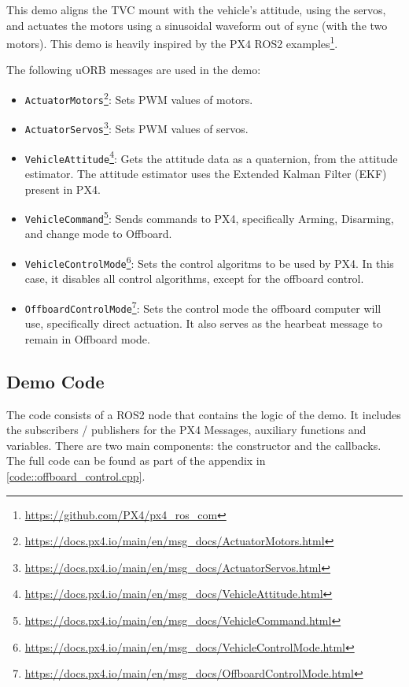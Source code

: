 \documentclass[a4paper]{article}
\begin{document}
This demo aligns the TVC mount with the vehicle's attitude, using the servos, and actuates the motors using a sinusoidal waveform out of sync (with the two motors). 
This demo is heavily inspired by the PX4 ROS2 examples\footnote{\url{https://github.com/PX4/px4_ros_com}}. 

The following uORB messages are used in the demo: 

\begin{itemize}
    \item \verb|ActuatorMotors|\footnote{\url{https://docs.px4.io/main/en/msg_docs/ActuatorMotors.html}}: Sets PWM values of motors. 
    \item \verb|ActuatorServos|\footnote{\url{https://docs.px4.io/main/en/msg_docs/ActuatorServos.html}}: Sets PWM values of servos. 
    \item \verb|VehicleAttitude|\footnote{\url{https://docs.px4.io/main/en/msg_docs/VehicleAttitude.html}}: Gets the attitude data as a quaternion, from the attitude estimator. The attitude estimator uses the Extended Kalman Filter (EKF) present in PX4. 
    \item \verb|VehicleCommand|\footnote{\url{https://docs.px4.io/main/en/msg_docs/VehicleCommand.html}}: Sends commands to PX4, specifically Arming, Disarming, and change mode to Offboard. 
    \item \verb|VehicleControlMode|\footnote{\url{https://docs.px4.io/main/en/msg_docs/VehicleControlMode.html}}: Sets the control algoritms to be used by PX4. In this case, it disables all control algorithms, except for the offboard control. 
    \item \verb|OffboardControlMode|\footnote{\url{https://docs.px4.io/main/en/msg_docs/OffboardControlMode.html}}: Sets the control mode the offboard computer will use, specifically direct actuation. It also serves as the hearbeat message to remain in Offboard mode. 
\end{itemize}

\subsection{Demo Code}

The code consists of a ROS2 node that contains the logic of the demo. 
It includes the subscribers / publishers for the PX4 Messages, auxiliary functions and variables. 
There are two main components: the constructor and the callbacks. 
The full code can be found as part of the appendix in \ref{code::offboard_control.cpp}. 
\end{document}
